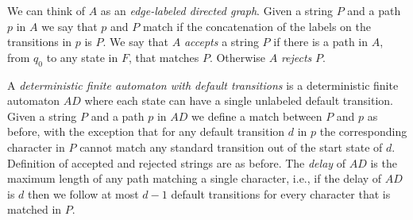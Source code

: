 \documentclass[a4paper,11pt]{article}
\begin{document}
We can think of $A$ as an \emph{edge-labeled directed graph}.
Given a string $P$ and a path $p$ in $A$ we say that $p$ and $P$ match if the concatenation of the labels on the transitions in $p$ is $P$. We say that $A$ \emph{accepts} a string $P$ if there is a path in $A$, from $q_0$ to any state in $F$, that matches $P$. Otherwise $A$ \emph{rejects} $P$.



A \emph{deterministic finite automaton with default transitions} is a deterministic finite automaton $AD$ where each state can have a single unlabeled default transition. Given a string $P$ and a path $p$ in $AD$ we define a match between $P$ and $p$ as before, with the exception that for any default transition $d$ in $p$ the corresponding character in $P$ cannot match any standard transition out of the start state of $d$. Definition of accepted and rejected strings are as before. The \emph{delay} of $AD$ is the maximum length of any path matching a single character, i.e., if the delay of $AD$ is $d$ then we follow at most $d-1$ default transitions for every character that is matched in $P$.
\end{document}
